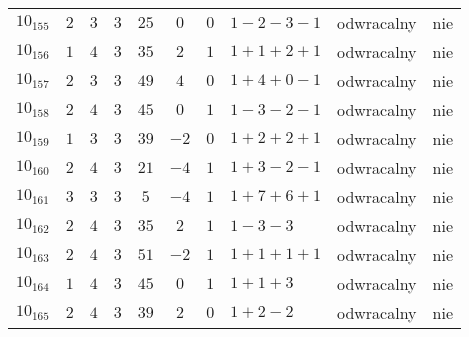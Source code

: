 \begin{longtable}{lccccccllc}
$10_{155}$ & $2$   & $3$ & $3$ & $25$  & $0$  & $0$ & $1-2-3-1$     & odwracalny & nie \\
$10_{156}$ & $1$   & $4$ & $3$ & $35$  & $2$  & $1$ & $1+1+2+1$     & odwracalny & nie \\
$10_{157}$ & $2$   & $3$ & $3$ & $49$  & $4$  & $0$ & $1+4+0-1$     & odwracalny & nie \\
$10_{158}$ & $2$   & $4$ & $3$ & $45$  & $0$  & $1$ & $1-3-2-1$     & odwracalny & nie \\
$10_{159}$ & $1$   & $3$ & $3$ & $39$  & $-2$ & $0$ & $1+2+2+1$     & odwracalny & nie \\
$10_{160}$ & $2$   & $4$ & $3$ & $21$  & $-4$ & $1$ & $1+3-2-1$     & odwracalny & nie \\
$10_{161}$ & $3$   & $3$ & $3$ & $5$   & $-4$ & $1$ & $1+7+6+1$     & odwracalny & nie \\
$10_{162}$ & $2$   & $4$ & $3$ & $35$  & $2$  & $1$ & $1-3-3$       & odwracalny & nie \\
$10_{163}$ & $2$   & $4$ & $3$ & $51$  & $-2$ & $1$ & $1+1+1+1$     & odwracalny & nie \\
$10_{164}$ & $1$   & $4$ & $3$ & $45$  & $0$  & $1$ & $1+1+3$       & odwracalny & nie \\
$10_{165}$ & $2$   & $4$ & $3$ & $39$  & $2$  & $0$ & $1+2-2$       & odwracalny & nie \\
\hline
\end{longtable}
\normalsize